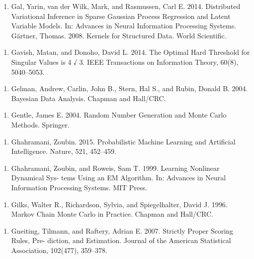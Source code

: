 \begin{enumerate}
\item Gal, Yarin, van der Wilk, Mark, and Rasmussen, Carl E. 2014. Distributed Variational Inference in Sparse Gaussian Process Regression and Latent Variable Models. In: Advances in Neural Information Processing Systems. Gärtner, Thomas. 2008. Kernels for Structured Data. World Scientiﬁc.
\end{enumerate}

\begin{enumerate}
\item Gavish, Matan, and Donoho, David L. 2014. The Optimal Hard Threshold for Singular Values is 4 √ 3. IEEE Transactions on Information Theory, 60(8), 5040–5053.
\end{enumerate}

\begin{enumerate}
\item Gelman, Andrew, Carlin, John B., Stern, Hal S., and Rubin, Donald B. 2004. Bayesian Data Analysis. Chapman and Hall/CRC.
\end{enumerate}

\begin{enumerate}
\item Gentle, James E. 2004. Random Number Generation and Monte Carlo Methods. Springer.
\end{enumerate}

\begin{enumerate}
\item Ghahramani, Zoubin. 2015. Probabilistic Machine Learning and Artiﬁcial Intelligence. Nature, 521, 452–459.
\end{enumerate}

\begin{enumerate}
\item Ghahramani, Zoubin, and Roweis, Sam T. 1999. Learning Nonlinear Dynamical Sys- tems Using an EM Algorithm. In: Advances in Neural Information Processing Systems. MIT Press.
\end{enumerate}

\begin{enumerate}
\item Gilks, Walter R., Richardson, Sylvia, and Spiegelhalter, David J. 1996. Markov Chain Monte Carlo in Practice. Chapman and Hall/CRC.
\end{enumerate}

\begin{enumerate}
\item Gneiting, Tilmann, and Raftery, Adrian E. 2007. Strictly Proper Scoring Rules, Pre- diction, and Estimation. Journal of the American Statistical Association, 102(477), 359–378.
\end{enumerate}

